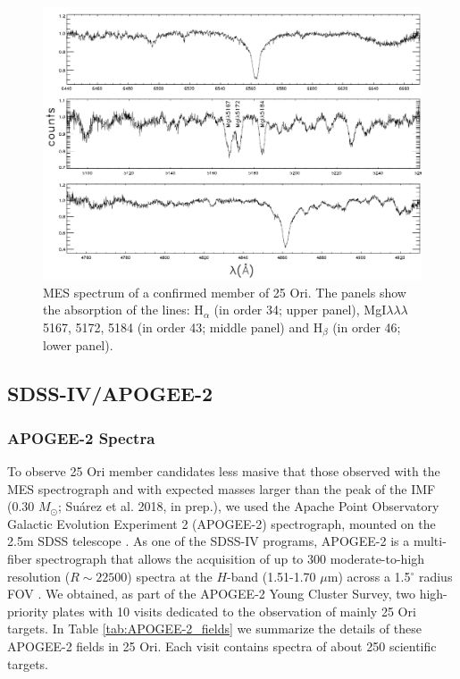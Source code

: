 \documentclass[12pt]{article}
\begin{document}
\begin{figure}[ht!]
	\centering
	\includegraphics[width=1.\textwidth]{MES_spectrum.pdf}
	\caption[MES spectrum of a confirmed member of 25 Ori]{MES spectrum of a confirmed member of 25 Ori. The panels show the absorption of the lines: H$_\alpha$ (in order 34; upper panel), MgI$\lambda\lambda\lambda$5167, 5172, 5184 (in order 43; middle panel) and H$_\beta$ (in order 46; lower panel).}
	\label{fig_MES:spectrum}
\end{figure}


\subsection{SDSS-IV/APOGEE-2}
\label{sec:APOGEE-2}

\subsubsection{APOGEE-2 Spectra}
\label{sec_APOGEE-2:spectra}
To observe 25 Ori member candidates less masive that those observed with the MES spectrograph and with expected masses larger than the peak of the IMF (0.30 $M_\odot$; Su\'arez et al. 2018, in prep.), we used the Apache Point Observatory Galactic Evolution Experiment 2 (APOGEE-2) spectrograph, mounted on the 2.5m SDSS telescope \citep{Gunn2006,Blanton2017}. As one of the SDSS-IV programs, APOGEE-2 is a multi-fiber spectrograph that allows the acquisition of up to 300 moderate-to-high resolution ($R\sim22500$) spectra at the $H$-band (1.51-1.70 $\mu$m) across a 1.5$^\circ$ radius FOV \citep{Wilson2010,Majewski2017}. We obtained, as part of the APOGEE-2 Young Cluster Survey, two high-priority plates with 10 visits dedicated to the observation of mainly 25 Ori targets. In Table \ref{tab:APOGEE-2_fields} we summarize the details of these APOGEE-2 fields in 25 Ori. Each visit contains spectra of about 250 scientific targets.
\end{document}
